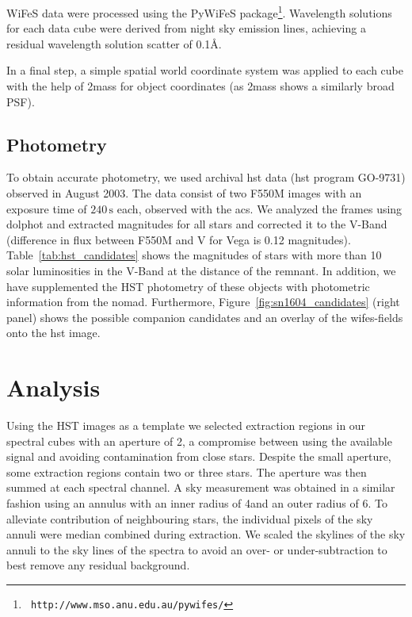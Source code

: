 \documentclass[preprint2]{aastex}
\begin{document}



WiFeS data were processed using the PyWiFeS package\footnote[1]{{\tt
http://www.mso.anu.edu.au/pywifes/}}.  Wavelength solutions for each
data cube were derived from night sky emission lines, achieving a
residual wavelength solution scatter of 0.1\AA.


In a final step, a simple spatial world coordinate system was applied to each cube with the help of \gls{2mass} for object coordinates (as \gls{2mass} shows a similarly broad PSF).



\subsection{Photometry}

To obtain accurate photometry, we used archival \gls{hst} data (\gls{hst} program GO-9731) observed in August 2003. The data consist of two F550M images with an exposure time of $240\,\textrm{s}$ each, observed with the \gls{acs}. We analyzed the frames using \gls{dolphot} and extracted magnitudes for all stars and corrected it to the V-Band (difference in flux between F550M and V for Vega is 0.12 magnitudes). Table~\ref{tab:hst_candidates} shows the magnitudes of stars with more than 10 solar luminosities in the V-Band at the distance of the remnant. In addition, we have supplemented the HST photometry of these objects with photometric information from the \gls{nomad}. Furthermore, Figure~\ref{fig:sn1604_candidates}  (right panel) shows the possible companion candidates and an overlay of the \gls{wifes}-fields onto the \gls{hst} image. 







\section{Analysis}
\label{sec:analysis}
 

Using the HST images as a template we selected extraction regions in our spectral cubes with an aperture of 2\arcsec, a compromise between using the available signal and avoiding contamination from close stars. Despite the small aperture, some extraction regions contain two or three stars. The aperture was then summed at each spectral channel. A sky measurement was obtained in a similar fashion using an annulus with an inner radius of 4\arcsec and an outer radius of 6\arcsec. To alleviate contribution of neighbouring stars,  the individual pixels of the sky annuli were median combined during extraction. We scaled the skylines of the sky annuli to the sky lines of the spectra to avoid an over- or under-subtraction to best remove any residual background.
\end{document}
